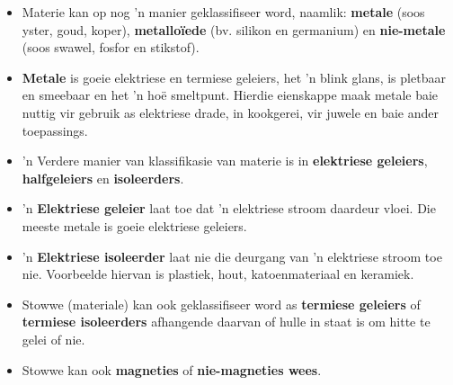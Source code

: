 \begin{itemize}[noitemsep]
\label{m38706*uid126}\item Materie kan op nog 'n manier geklassifiseer word, naamlik: \textbf{metale} (soos yster, goud, koper), \textbf{metallo\"iede} (bv. silikon en germanium) en \textbf{nie-metale} (soos swawel, fosfor en stikstof).
\label{m38706*uid127}\item \textbf{Metale} is goeie elektriese en termiese geleiers, het 'n blink glans, is pletbaar en smeebaar en het 'n ho\"e smeltpunt. Hierdie eienskappe maak metale baie nuttig vir gebruik as elektriese drade, in kookgerei, vir juwele en baie ander toepassings.
\label{m38706*uid128}\item 'n Verdere manier van klassifikasie van materie is in \textbf{elektriese geleiers}, \textbf{halfgeleiers} en \textbf{isoleerders}.
\label{m38706*uid129}\item 'n \textbf{Elektriese geleier} laat toe dat 'n elektriese stroom daardeur vloei. Die meeste metale is goeie elektriese geleiers.
\label{m38706*uid130}\item 'n \textbf{Elektriese isoleerder} laat nie die deurgang van 'n elektriese stroom toe nie. Voorbeelde hiervan is plastiek, hout, katoenmateriaal en keramiek.
\label{m38706*uid131}\item Stowwe (materiale) kan ook geklassifiseer word as \textbf{termiese geleiers} of \textbf{termiese isoleerders} afhangende daarvan of hulle in staat is om hitte te gelei of nie.
\label{m38706*uid132}\item Stowwe kan ook \textbf{magneties} of \textbf{nie-magneties wees}.
\end{itemize} \pagebreak

